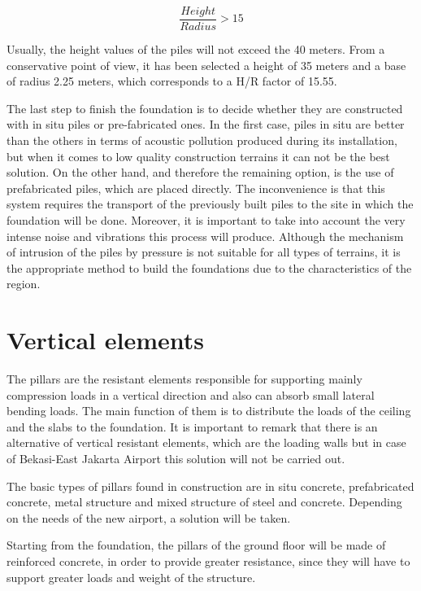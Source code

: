 \begin{equation}
\frac{Height}{Radius}>15
\end{equation}

Usually, the height values of the piles will not exceed the 40 meters. From a conservative point of view, it has been selected a height of 35 meters and a base of radius 2.25 meters, which corresponds to a H/R factor of 15.55.

The last step to finish the foundation is to decide whether they are constructed with in situ piles or pre-fabricated ones. In the first case, piles in situ are better than the others in terms of acoustic pollution produced during its installation, but when it comes to low quality construction terrains it can not be the best solution. On the other hand, and therefore the remaining option, is the use of prefabricated piles, which are placed directly. The inconvenience is that this system requires the transport of the previously built piles to the site in which the foundation will be done. Moreover, it is important to take into account the very intense noise and vibrations this process will produce. Although the mechanism of intrusion of the piles by pressure is not suitable for all types of terrains, it is the appropriate method to build the foundations due to the characteristics of the region.

	\section{Vertical elements}
The pillars are the resistant elements responsible for supporting mainly compression loads in a vertical direction and also can absorb small lateral bending loads. The main function of them is to distribute the loads of the ceiling and the slabs to the foundation. It is important to remark that there is an alternative of vertical resistant elements, which are the loading walls but in case of Bekasi-East Jakarta Airport this solution will not be carried out.

The basic types of pillars found in construction are in situ concrete, prefabricated concrete, metal structure and mixed structure of steel and concrete. Depending on the needs of the new airport, a solution will be taken.

Starting from the foundation, the pillars of the ground floor will be made of reinforced concrete, in order to provide greater resistance, since they will have to support greater loads and  weight of the structure.

